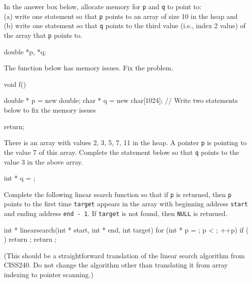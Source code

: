 

\nextq
In the answer box below, allocate memory for \verb!p! and \verb!q! to point to:
\\
(a) write one statement so that \verb!p! points to an array of size 10 in
the heap and
\\
(b) write one statement so that \verb!q! points to the third value
(i.e., index 2 value) of the array that \verb!p! points to.
\\
\ANSWER
\begin{answercode}
double *p, *q;

\end{answercode}

\nextq
The function below has memory issues. Fix the problem.
\\
\ANSWER
\begin{answercode}
void f()
{
    double * p = new double;
    char * q = new char[1024];
    // Write two statements below to fix the memory issues

    return;
}
\end{answercode}

\nextq
There is an array with values 2, 3, 5, 7, 11 in the heap.
A pointer \verb!p! is pointing to the value 7 of this array.
Complete the statement below so that \verb!q! points to the value 3
in the above array.
\\
\ANSWER
\begin{answercode}
int * q =          ;
\end{answercode}

\nextq
Complete the following linear search function so that
if \verb!p! is returned, then \verb!p! points to the first time
\verb!target! appears in the array with beginning address
\verb!start! and ending address \verb!end - 1!.
If \verb!target! is not found, then \verb!NULL! is returned.
\\
\ANSWER
\begin{answercode}
int * linearsearch(int * start, int * end, int target)
{
    for (int * p =          ; p <          ; ++p)
    {
        if (              )
        {
            return            ;
        }
    }
    return              ;
}
\end{answercode}
(This should be a straightforward translation of the linear search
algorithm from CISS240. Do not change the algorithm other than
translating it from array indexing to pointer scanning.)

